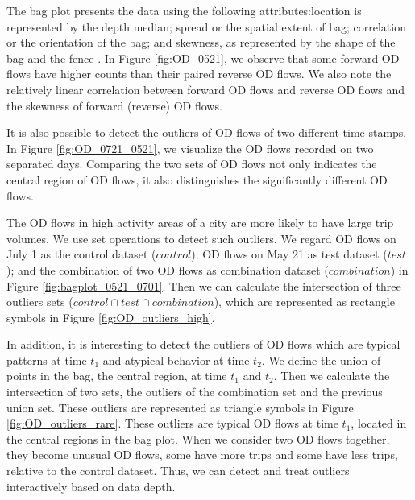 \documentclass[a4paper,UKenglish]{lipics-v2018}
\begin{document}
The bag plot presents the data using the following attributes:location is represented by the depth median; spread or the spatial extent of bag; correlation or the orientation of the bag; and skewness, as represented by the shape of the bag and the fence \cite{rousseeuw99AS}.
In Figure \ref{fig:OD_0521}, we observe that some forward OD flows have higher counts than their paired reverse OD flows. We also note the relatively linear correlation between forward OD flows and reverse OD flows and the skewness of forward (reverse) OD flows. 

It is also possible to detect the outliers of OD flows of two different time stamps.
In Figure \ref{fig:OD_0721_0521}, we visualize the OD flows recorded on two separated days.
Comparing the two sets of OD flows not only indicates the central region of OD flows, it also distinguishes the significantly different OD flows. 


The OD flows in high activity areas of a city are more likely to have large trip volumes.
We use set operations to detect such outliers.
We regard OD flows on July 1 as the control dataset ($control$); OD flows on May 21 as test dataset ($test$); and the combination of two OD flows as combination dataset ($combination$) in Figure \ref{fig:bagplot_0521_0701}. Then we can calculate the intersection of three outliers sets ($control \cap test \cap combination$), which are represented as rectangle symbols in Figure \ref{fig:OD_outliers_high}. 

In addition, it is interesting to detect the outliers of OD flows which are typical patterns at time $t_1$ and atypical behavior at time $t_2$.
We define the union of points in the bag, the central region, at time $t_1$ and $t_2$.
Then we calculate the intersection of two sets, the outliers of the combination set and the previous union set. These outliers are represented as triangle symbols in Figure \ref{fig:OD_outliers_rare}. These outliers are typical OD flows at time $t_1$, located in the central regions in the bag plot. When we consider two OD flows together, they become unusual OD flows, some have more trips and some have less trips, relative to the control dataset. Thus, we can detect and treat outliers interactively based on data depth.

\end{document}
